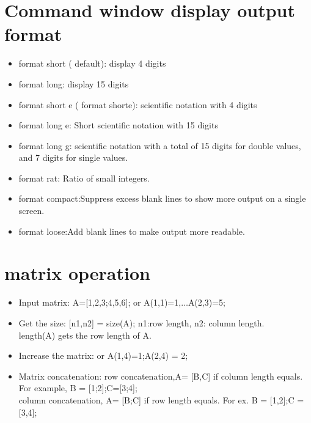 \documentclass{article}
\begin{document}
 \section{Command window display output format}
   \begin{itemize}
     \item format short ( default): display 4 digits
           
     \item format long: display 15 digits
     \item format short e ( format shorte): scientific notation with 4 digits 
      \item            format long e: Short scientific notation with 15 digits
     \item format long g: scientific notation with a total of 15 digits for double values, and 7 digits for single values.
     \item format rat: Ratio of small integers.
     \item format compact:Suppress excess blank lines to show more output on a single screen.
     \item format loose:Add blank lines to make output more readable.
   \end{itemize}
 
 \section{matrix operation}
   \begin{itemize}
     \item Input matrix: A=[1,2,3;4,5,6]; or A(1,1)=1,$\ldots$A(2,3)=5;
     \item Get the size: [n1,n2] = size(A);
          {\small \color{blue} n1:row length, n2:  column length.}\\
           length(A)  gets the row length of A.
     \item Increase the matrix: 
           or A(1,4)=1;A(2,4) = 2;
     \item Matrix concatenation: row concatenation,A= [B,C] if column length equals. For example, B = [1;2];C=[3;4];\\
           column concatenation, A= [B;C] if row length equals. For ex. B = [1,2];C = [3,4];
   \end{itemize}
 
\end{document}
